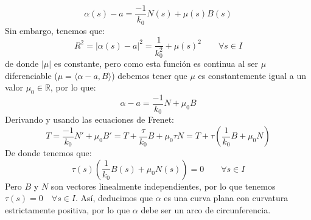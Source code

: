 \begin{ejercicio}
\begin{description}
            \begin{equation*}
                \alpha(s)-a = \frac{-1}{k_0}N(s) + \mu(s)B(s)
            \end{equation*}
            Sin embargo, tenemos que:
            \begin{equation*}
                R^2 = |\alpha(s)-a|^2 = \frac{1}{k_0^2} + \mu(s)^2\qquad \forall s\in I
            \end{equation*}
            de donde $|\mu|$ es constante, pero como esta función es continua al ser $\mu$ diferenciable ($\mu = \langle \alpha-a,B \rangle $) debemos tener que $\mu$ es constantemente igual a un valor $\mu_0\in \mathbb{R}$, por lo que:
            \begin{equation*}
                \alpha-a = \frac{-1}{k_0}N + \mu_0 B
            \end{equation*}
            Derivando y usando las ecuaciones de Frenet:
            \begin{equation*}
                T = \frac{-1}{k_0}N' + \mu_0 B' = T + \frac{\tau}{k_0}B + \mu_0\tau N = T + \tau\left(\frac{1}{k_0}B + \mu_0N\right)
            \end{equation*}
            De donde tenemos que:
            \begin{equation*}
                \tau(s)\left(\frac{1}{k_0}B(s) + \mu_0N(s)\right) = 0  \qquad \forall s\in I
            \end{equation*}
            Pero $B$ y $N$ son vectores linealmente independientes, por lo que tenemos $\tau(s) = 0 \quad \forall s\in I$. Así, deducimos que $\alpha$ es una curva plana con curvatura estrictamente positiva, por lo que $\alpha$ debe ser un arco de circunferencia.
    \end{description}
\end{ejercicio}


